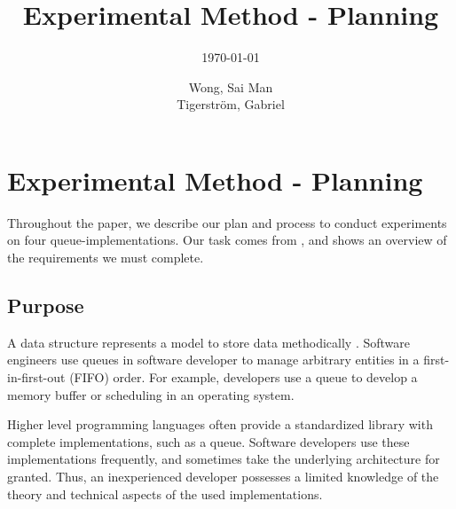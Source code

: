 \documentclass[a4paper,11pt]{kth-mag}
\title{Experimental Method - Planning}
\subtitle{\today}
\author{Wong, Sai Man\\ Tigerstr\"{o}m, Gabriel}
\newcommand*{\skippara}{\par\vspace{\baselineskip} \noindent}
\begin{document}
\frontmatter
\pagestyle{empty}
\removepagenumbers
\maketitle
{}



{
      \hypersetup{linkcolor=black}
      \tableofcontents*
}
\mainmatter
\pagestyle{newchap}

\chapter{Experimental Method - Planning}
Throughout the paper, we describe our plan and process to conduct experiments on four queue-implementations.
Our task comes from \cite{Uppgiftl9:online}, and \cite{Uppgiftl9:online} shows an overview of the requirements we must complete.

\section{Purpose}\label{sec:purpose}
A data structure represents a model to store data methodically \cite{deshpande2004c}.
Software engineers use queues in software developer to manage arbitrary entities in a first-in-first-out (FIFO) order.
For example, developers use a queue to develop a memory buffer or scheduling in an operating system.

\skippara Higher level programming languages often provide a standardized library with complete implementations, such as a queue.
Software developers use these implementations frequently, and sometimes take the underlying architecture for granted.
Thus, an inexperienced developer possesses a limited knowledge of the theory and technical aspects of the used implementations.
\end{document}
